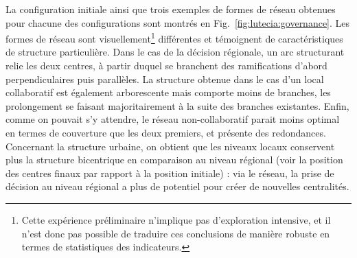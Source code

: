 La configuration initiale ainsi que trois exemples de formes de réseau obtenues pour chacune des configurations sont montrés en Fig.~\ref{fig:lutecia:governance}. Les formes de réseau sont visuellement\footnote{Cette expérience préliminaire n'implique pas d'exploration intensive, et il n'est donc pas possible de traduire ces conclusions de manière robuste en termes de statistiques des indicateurs.} différentes et témoignent de caractéristiques de structure particulière. Dans le cas de la décision régionale, un arc structurant relie les deux centres, à partir duquel se branchent des ramifications d'abord perpendiculaires puis parallèles. La structure obtenue dans le cas d'un local collaboratif est également arborescente mais comporte moins de branches, les prolongement se faisant majoritairement à la suite des branches existantes. Enfin, comme on pouvait s'y attendre, le réseau non-collaboratif parait moins optimal en termes de couverture que les deux premiers, et présente des redondances. Concernant la structure urbaine, on obtient que les niveaux locaux conservent plus la structure bicentrique en comparaison au niveau régional (voir la position des centres finaux par rapport à la position initiale) : via le réseau, la prise de décision au niveau régional a plus de potentiel pour créer de nouvelles centralités.


